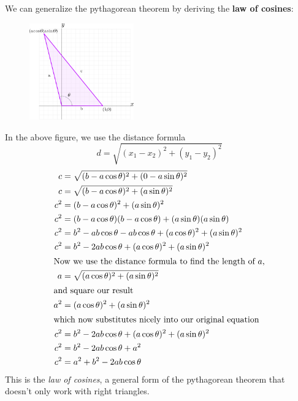 We can generalize the pythagorean theorem by deriving the \textbf{law of cosines}:
\begin{figure}[H]
  \begin{center}
    \includegraphics[width=0.4\textwidth]{continuous/trig/lawcosines}
  \end{center}
\end{figure}
In the above figure, we use the distance formula
\begin{equation}
  d=\sqrt{(x_1 - x_2)^2+(y_1-y_2)^2}
  \label{eq:distance}
\end{equation}
\begin{align}
  \notag  c &= \sqrt{(b-a\cos \theta)^2+(0-a\sin\theta)^2} \\
  \notag  c&=\sqrt{(b-a\cos\theta)^2+(a\sin\theta)^2} \\
  \notag  c^2&=(b-a\cos\theta)^2+(a\sin\theta)^2 \\
  \notag  c^2 &= (b-a\cos\theta)(b-a\cos\theta)+(a\sin\theta)(a\sin\theta) \\
  \notag  c^2 &= b^2 -ab\cos\theta -ab\cos\theta+(a\cos\theta)^2+(a\sin\theta)^2\\
  \notag  c^2&=b^2-2ab\cos\theta+(a\cos\theta)^2+(a\sin\theta)^2\\
  \intertext{Now we use the distance formula to find the length of $a$,}
  \notag  a&=\sqrt{(a\cos\theta)^2+(a\sin\theta)^2}\\
  \intertext{and square our result}
  \notag  a^2&=(a\cos\theta)^2+(a\sin\theta)^2\\
  \intertext{which now substitutes nicely into our original equation}
  \notag  c^2&=b^2-2ab\cos\theta+(a\cos\theta)^2+(a\sin\theta)^2\\
  \notag  c^2&=b^2-2ab\cos\theta+a^2\\
  c^2&=a^2+b^2-2ab\cos\theta
\end{align}
This is the \emph{law of cosines}, a general form of the pythagorean theorem that doesn't only work with right triangles.

